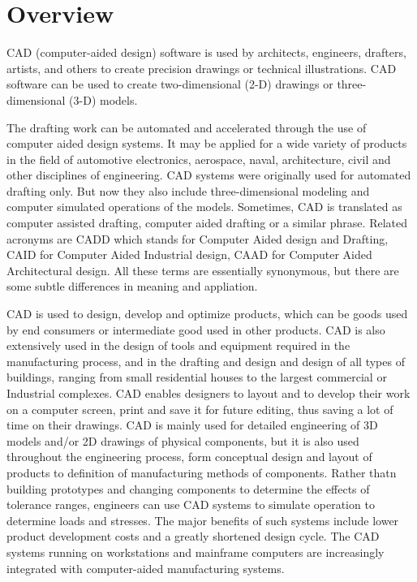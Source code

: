 \section{Overview}

CAD (computer-aided design) software is used by architects, engineers, drafters, artists, and others to create precision drawings or technical illustrations. CAD software can be used to create two-dimensional (2-D) drawings or three-dimensional (3-D) models.

The drafting work can be automated and accelerated through the use of computer aided design systems. It may be applied for a wide variety of products in the field of automotive electronics, aerospace, naval, architecture, civil and other disciplines of engineering. CAD systems were originally used for automated drafting only. But now they also include three-dimensional modeling and computer simulated operations of the models. Sometimes, CAD is translated as computer assisted drafting, computer aided drafting or a similar phrase. Related acronyms are CADD which stands for Computer Aided design and Drafting, CAID for Computer Aided Industrial design, CAAD for Computer Aided Architectural design. All these terms are essentially synonymous, but there are some subtle differences in meaning and appliation.

CAD is used to design, develop and optimize products, which can be goods used by end consumers or intermediate good used in other products. CAD is also extensively used in the design of tools and equipment required in the manufacturing process, and in the drafting and design and design of all types of buildings, ranging from small residential houses to the largest commercial or Industrial complexes. CAD enables designers to layout and to develop their work on a computer screen, print and save it for future editing, thus saving a lot of time on their drawings. CAD is mainly used for detailed engineering of 3D models and/or 2D drawings of physical components, but it is also used throughout the engineering process, form conceptual design and layout of products to definition of manufacturing methods of components. Rather thatn building prototypes and changing components to determine the effects of tolerance ranges, engineers can use CAD systems to simulate operation to determine loads and stresses. The major benefits of such systems include lower product development costs and a greatly shortened design cycle. The CAD systems running on workstations and mainframe computers are increasingly integrated with computer-aided manufacturing systems.

